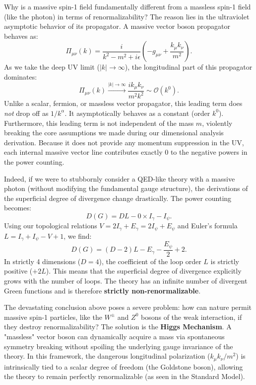 \begin{example}
    Why is a massive spin-1 field fundamentally different from a massless spin-1 field (like the photon) in terms of renormalizability? The reason lies in the ultraviolet asymptotic behavior of its propagator. A massive vector boson propagator behaves as:
    \[
        \Pi_{\mu\nu}(k) = \frac{i}{k^2 - m^2 + i \epsilon} \left(- g_{\mu\nu}  + \frac{k_\mu k_\nu}{m^2}\right).
    \]
    As we take the deep UV limit ($|k| \to \infty$), the longitudinal part of this propagator dominates:
    \[
        \Pi_{\mu\nu}(k) \xrightarrow{|k| \to \infty} \frac{i k_\mu k_\nu}{m^2 k^2} \sim \mathcal{O}(k^0).
    \]
    Unlike a scalar, fermion, or massless vector propagator, this leading term does \textit{not} drop off as $1/k^\alpha$. It asymptotically behaves as a constant (order $k^0$). Furthermore, this leading term is not independent of the mass $m$, violently breaking the core assumptions we made during our dimensional analysis derivation. Because it does not provide any momentum suppression in the UV, each internal massive vector line contributes exactly $0$ to the negative powers in the power counting.

    Indeed, if we were to stubbornly consider a QED-like theory with a massive photon (without modifying the fundamental gauge structure), the derivations of the superficial degree of divergence change drastically. The power counting becomes:
    \[
        D(G) = D L - 0 \times I_\gamma - I_\psi.
    \]
    Using our topological relations $V = 2I_\gamma + E_\gamma = 2I_\psi + E_\psi$ and Euler's formula $L = I_\gamma + I_\psi - V + 1$, we find:
    \[
        D(G) = (D - 2)L - E_\gamma - \frac{E_\psi}{2} + 2.
    \]
    In strictly 4 dimensions ($D=4$), the coefficient of the loop order $L$ is strictly positive ($+2L$). This means that the superficial degree of divergence explicitly grows with the number of loops. The theory has an infinite number of divergent Green functions and is therefore \textbf{strictly non-renormalizable}.
\end{example}

\begin{remark}
    The devastating conclusion above poses a severe problem: how can nature permit massive spin-1 particles, like the $W^\pm$ and $Z^0$ bosons of the weak interaction, if they destroy renormalizability? The solution is the \textbf{Higgs Mechanism}. A "massless" vector boson can dynamically acquire a mass via spontaneous symmetry breaking without spoiling the underlying gauge invariance of the theory. In this framework, the dangerous longitudinal polarization ($k_\mu k_\nu / m^2$) is intrinsically tied to a scalar degree of freedom (the Goldstone boson), allowing the theory to remain perfectly renormalizable (as seen in the Standard Model).
\end{remark}

